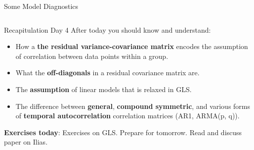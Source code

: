 \documentclass{beamer}
\begin{document}
\begin{frame}[fragile]{Some Model Diagnostics}
\begin{columns}
\begin{column}{0.5\textwidth}
    \end{column}  
    \end{columns}
\end{frame}

\begin{frame}{Recapitulation Day 4}
  After today you should know and understand:
  \begin{itemize}
    \item How a \textbf{the residual variance-covariance matrix} encodes the assumption of correlation between data points within a group.
    \item What the \textbf{off-diagonals} in a residual covariance matrix are.
    \item The \textbf{assumption} of linear models that is relaxed in GLS.
    \item The difference between \textbf{general}, \textbf{compound symmetric}, and various forms of \textbf{temporal autocorrelation} correlation matrices (AR1, ARMA(p, q)).
  \end{itemize}
  \textbf{Exercises today}: Exercises on GLS. Prepare for tomorrow. Read and discuss paper on Ilias.
\end{frame}
\end{document}
